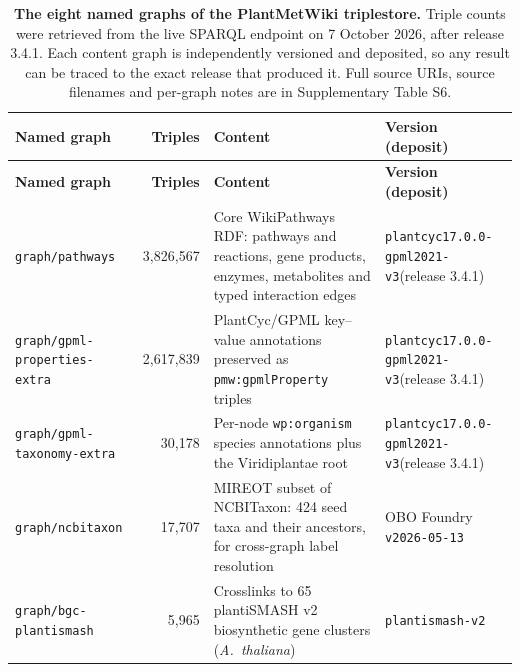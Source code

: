 \documentclass[11pt,a4paper]{article}
\newcommand{\rev}[1]{#1}
\begin{document}
{\footnotesize
\begin{longtable}{@{}>{\raggedright\arraybackslash}p{}
                    r@{\hspace{1.2em}}
                    >{\raggedright\arraybackslash}p{}
                    >{\raggedright\arraybackslash}p{}@{}}
\caption{\textbf{The eight named graphs of the PlantMetWiki triplestore.}
\rev{Triple counts were retrieved from the live SPARQL endpoint on 7 October 2026, after release 3.4.1.}
Each content graph is independently versioned and deposited, so any result can
be traced to the exact release that produced it. Full source URIs, source
filenames and per-graph notes are in Supplementary Table S6.}
\label{tab:graphs}\\
\toprule
\textbf{Named graph} & \textbf{Triples} & \textbf{Content} & \textbf{Version (deposit)} \\
\midrule
\endfirsthead
\toprule
\textbf{Named graph} & \textbf{Triples} & \textbf{Content} & \textbf{Version (deposit)} \\
\midrule
\endhead
\bottomrule
\endfoot
\texttt{graph/pathways} & \rev{3,826,567} &
Core WikiPathways RDF: pathways and reactions, gene products, enzymes,
metabolites and typed interaction edges &
\texttt{plantcyc17.0.0-} \texttt{gpml2021-v3}\newline \rev{(release 3.4.1)}~\cite{delpup2026rdf} \\
\addlinespace
\texttt{graph/gpml-} \texttt{properties-extra} & 2,617,839 &
PlantCyc/GPML key--value annotations preserved as \texttt{pmw:gpmlProperty}
triples &
\texttt{plantcyc17.0.0-} \texttt{gpml2021-v3}\newline \rev{(release 3.4.1)}~\cite{delpup2026rdf} \\
\addlinespace
\texttt{graph/gpml-} \texttt{taxonomy-extra} & 30,178 &
Per-node \texttt{wp:organism} species annotations plus the Viridiplantae root &
\texttt{plantcyc17.0.0-} \texttt{gpml2021-v3}\newline \rev{(release 3.4.1)}~\cite{delpup2026rdf} \\
\addlinespace
\texttt{graph/ncbitaxon} & 17,707 &
MIREOT subset of NCBITaxon: 424 seed taxa and their ancestors, for
cross-graph label resolution &
OBO Foundry \texttt{v2026-05-13} \\
\addlinespace
\texttt{graph/bgc-} \texttt{plantismash} & 5,965 &
Crosslinks to 65 plantiSMASH v2 biosynthetic gene clusters
(\textit{A.\ thaliana}) &
\texttt{plantismash-v2}\newline\cite{delpup2026bgc} \\

\end{longtable}}
\end{document}
